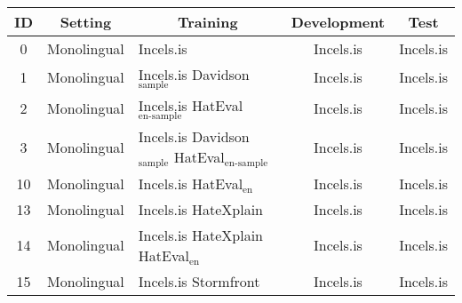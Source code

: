 \begin{tabular}{|c|c|p{4cm}|c|c|}
\hline
\textbf{ID} & \textbf{Setting} & \multicolumn{1}{c|}{\textbf{Training}} & \textbf{Development} & \textbf{Test} \\ \hline
0 & Monolingual & Incels.is & Incels.is & Incels.is \\ \hline
1 & Monolingual & Incels.is \newline Davidson$_{\mbox{sample}}$ & Incels.is & Incels.is \\ \hline
2 & Monolingual & Incels.is \newline HatEval$_{\mbox{en-sample}}$ & Incels.is & Incels.is \\ \hline
3 & Monolingual & Incels.is \newline Davidson$_{\mbox{sample}}$ \newline HatEval$_{\mbox{en-sample}}$ & Incels.is & Incels.is \\ \hline
10 & Monolingual & Incels.is \newline HatEval$_{\mbox{en}}$ & Incels.is & Incels.is \\ \hline
13 & Monolingual & Incels.is \newline HateXplain & Incels.is & Incels.is \\ \hline
14 & Monolingual & Incels.is \newline HateXplain \newline HatEval$_{\mbox{en}}$ & Incels.is & Incels.is \\ \hline
15 & Monolingual & Incels.is \newline Stormfront & Incels.is & Incels.is \\ \hline

\end{tabular}

